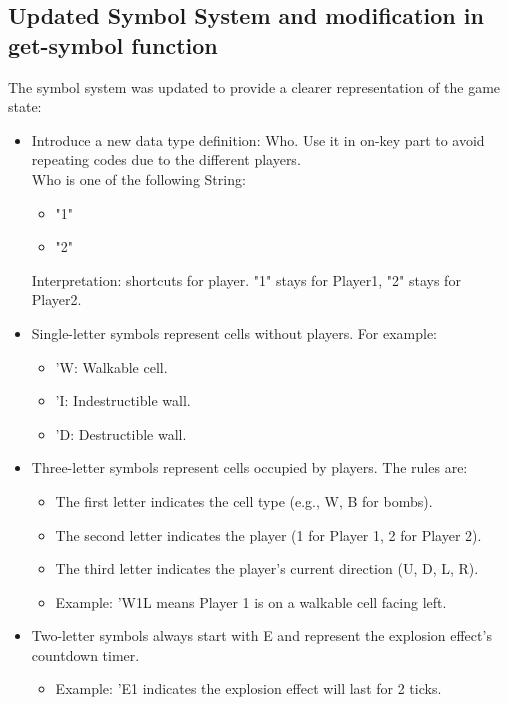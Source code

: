 \documentclass[12pt]{article}
\begin{document}
\subsection*{Updated Symbol System and modification in get-symbol function}
\hspace*{1.27cm}The symbol system was updated to provide a clearer representation of the game state:  
\begin{itemize}
  \item Introduce a new data type definition: Who. Use it in on-key part to avoid repeating codes due to the different players. \\
  Who is one of the following String: 
   \begin{itemize}
      \item "1"
      \item "2"
    \end{itemize}
 Interpretation: shortcuts for player. "1" stays for Player1, "2" stays for Player2.
  \item Single-letter symbols represent cells without players. For example:
    \begin{itemize}
      \item 'W: Walkable cell.
      \item 'I: Indestructible wall.
      \item 'D: Destructible wall.
    \end{itemize}
  \item Three-letter symbols represent cells occupied by players. The rules are:
    \begin{itemize}
      \item The first letter indicates the cell type (e.g., W, B for bombs).
      \item The second letter indicates the player (1 for Player 1, 2 for Player 2).
      \item The third letter indicates the player's current direction (U, D, L, R).
      \item Example: 'W1L means Player 1 is on a walkable cell facing left.
    \end{itemize}
  \item Two-letter symbols always start with E and represent the explosion effect's countdown timer.
    \begin{itemize}
      \item Example: 'E1 indicates the explosion effect will last for 2 ticks.
    \end{itemize}
\end{itemize}
\end{document}
